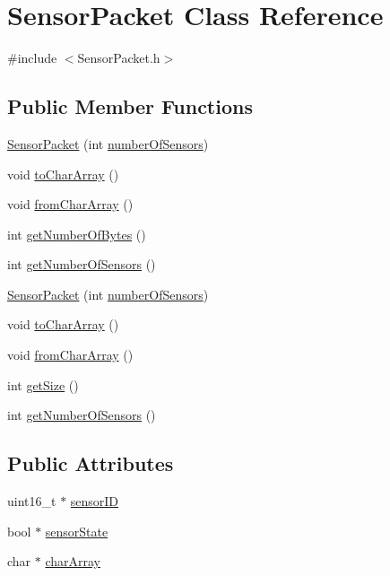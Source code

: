 \hypertarget{class_sensor_packet}{}\section{Sensor\+Packet Class Reference}
\label{class_sensor_packet}


{\ttfamily \#include $<$Sensor\+Packet.\+h$>$}

\subsection*{Public Member Functions}
\begin{DoxyCompactItemize}
\item 
\mbox{\hyperlink{class_sensor_packet_a185c826ce5d740e863d78027905af153}{Sensor\+Packet}} (int \mbox{\hyperlink{class_sensor_packet_a10722ca574e0e8d7426e8b9f244cddd1}{number\+Of\+Sensors}})
\item 
void \mbox{\hyperlink{class_sensor_packet_a62ddad44510c43bee65197edcc9a158c}{to\+Char\+Array}} ()
\item 
void \mbox{\hyperlink{class_sensor_packet_a04fda43f727489cc20ab5f786bfb921f}{from\+Char\+Array}} ()
\item 
int \mbox{\hyperlink{class_sensor_packet_abd1e63743a65148c9923542c5854d866}{get\+Number\+Of\+Bytes}} ()
\item 
int \mbox{\hyperlink{class_sensor_packet_ac67ada8a2e68fda448400da75a8bf35c}{get\+Number\+Of\+Sensors}} ()
\item 
\mbox{\hyperlink{class_sensor_packet_a185c826ce5d740e863d78027905af153}{Sensor\+Packet}} (int \mbox{\hyperlink{class_sensor_packet_a10722ca574e0e8d7426e8b9f244cddd1}{number\+Of\+Sensors}})
\item 
void \mbox{\hyperlink{class_sensor_packet_a62ddad44510c43bee65197edcc9a158c}{to\+Char\+Array}} ()
\item 
void \mbox{\hyperlink{class_sensor_packet_a04fda43f727489cc20ab5f786bfb921f}{from\+Char\+Array}} ()
\item 
int \mbox{\hyperlink{class_sensor_packet_a1c14bb767dbc2497312c4e56dcde7ba2}{get\+Size}} ()
\item 
int \mbox{\hyperlink{class_sensor_packet_ac67ada8a2e68fda448400da75a8bf35c}{get\+Number\+Of\+Sensors}} ()
\end{DoxyCompactItemize}
\subsection*{Public Attributes}
\begin{DoxyCompactItemize}
\item 
uint16\+\_\+t $\ast$ \mbox{\hyperlink{class_sensor_packet_a20c88aab2eaafeb97d3cbe2d9755df98}{sensor\+ID}}
\item 
bool $\ast$ \mbox{\hyperlink{class_sensor_packet_ae8bf993c2ad176abc7ed277a7da9c6a8}{sensor\+State}}
\item 
char $\ast$ \mbox{\hyperlink{class_sensor_packet_ae211f0883253b296b17586bc99b97a18}{char\+Array}}
\end{DoxyCompactItemize}
